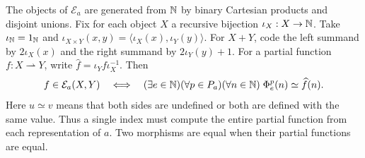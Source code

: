 The objects of $\mathcal E_a$ are generated from $\mathbb N$ by binary
Cartesian products and disjoint unions. Fix for each object $X$ a
recursive bijection $\iota_X:X\to\mathbb N$. Take $\iota_{\mathbb N}=1_{\mathbb N}$
and $\iota_{X\times Y}(x,y)=\langle\iota_X(x),\iota_Y(y)\rangle$.
For $X+Y$, code the left summand by $2\iota_X(x)$ and the right
summand by $2\iota_Y(y)+1$.
For a partial function
$f:X\rightharpoonup Y$, write $\widehat f=\iota_Y f\iota_X^{-1}$.
Then
\[
 f\in\mathcal E_a(X,Y)
 \quad\Longleftrightarrow\quad
 (\exists e\in\mathbb N)(\forall p\in P_a)(\forall n\in\mathbb N)\;
       \Phi_e^p(n)\simeq\widehat f(n).
\]
Here $u\simeq v$ means that both sides are undefined or both are
defined with the same value. Thus a single index must compute the
entire partial function from each representation of $a$. Two morphisms
are equal when their partial functions are equal.

